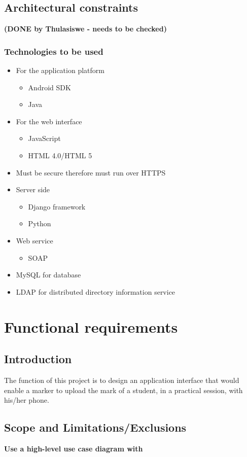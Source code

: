 \documentclass[11pt,a4paper]{article}
\begin{document}
\subsection{Architectural constraints}
\textbf{(DONE by Thulasiswe - needs to be checked)}\\
\subsubsection{Technologies to be used}
	\begin{itemize}
		\item For the application platform
		\begin{itemize}
			\item Android SDK
			\item Java
		\end{itemize}
		\item For the web interface
		\begin{itemize}
			\item JavaScript
			\item HTML 4.0/HTML 5
		\end{itemize}
		\item Must be secure therefore must run over HTTPS
		\item Server side
		\begin{itemize}
			\item Django framework
			\item Python
		\end{itemize}
		\item Web service
		\begin{itemize}
			\item SOAP
		\end{itemize}
		\item MySQL for database
		\item LDAP for distributed directory information service
	\end{itemize}

\section{Functional requirements}
\subsection{Introduction}
The function of this project is to design an application interface that would enable a marker to upload the mark of a student, in a practical session, with his/her phone.
\subsection{Scope and Limitations/Exclusions}
\textbf {Use a high-level use case diagram with}\\
\end{document}
